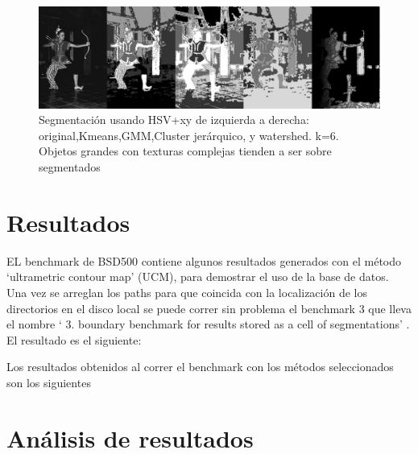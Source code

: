 \documentclass[10pt,twocolumn,letterpaper]{article}
\begin{document}
\begin{figure}
\begin{center}
\includegraphics[width=0.95\linewidth]
                  {img/woman.jpg}
\end{center}
  \caption{Segmentación usando HSV+xy de izquierda a derecha: original,Kmeans,GMM,Cluster jerárquico, y watershed. k=6. Objetos grandes con texturas complejas tienden a ser sobre segmentados}
\label{fig:pyra}
\end{figure}


\section{Resultados}

EL benchmark de BSD500 contiene algunos resultados generados con el método ‘ultrametric contour map’ (UCM), para demostrar el uso de la base de datos. Una vez se arreglan los paths para que coincida con la localización de los directorios en el disco local se puede correr sin problema el benchmark 3 que lleva el nombre ‘ 3. boundary benchmark for results stored as a cell of segmentations’ . El resultado es el siguiente:


Los resultados obtenidos al correr el benchmark con los métodos seleccionados son los siguientes

\section{Análisis de resultados}
\end{document}
